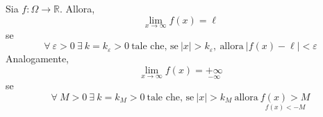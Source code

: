 \begin{definition} \label{Def: Limiti all'infinito}
    Sia $f:\Omega \to \mathbb{R}$. Allora, 
    \begin{equation}
        \lim_{x \to \infty}{f(x)}=\ell
    \end{equation}
    se
    \begin{equation}
        \forall\ \varepsilon > 0 \ \exists\ k=k_\varepsilon>0 \ \text{tale che, se}\ |x|>k_\varepsilon,\ \text{allora}\ |f(x)-\ell|<\varepsilon
    \end{equation}
    Analogamente,
    \begin{equation}
        \lim_{x \to \infty}{f(x)}=\underset{-\infty}{+\infty}
    \end{equation}
    se 
    \begin{equation}
        \forall\ M>0\ \exists\ k=k_M>0 \ \text{tale che, se}\ |x|>k_M\ \text{allora}\ \underset{f(x)<-M}{f(x)>M}
    \end{equation}
\end{definition}
